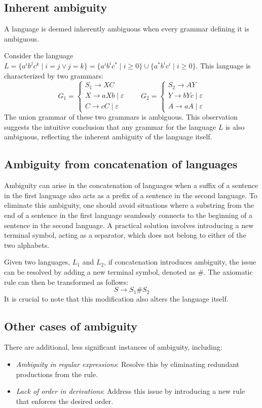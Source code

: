\subsection{Inherent ambiguity}
A language is deemed inherently ambiguous when every grammar defining it is ambiguous.
\begin{example}
    Consider the language $L=\{a^ib^jc^k\mid i=j \lor j=k\}=\{a^ib^ic^{\ast}\mid i \geq 0\} \cup \{a^{\ast}b^ic^i\mid i \geq 0\}$. 
    This language is characterized by two grammars:
    \[G_1=\begin{cases}
        S_1 \rightarrow XC \\
        X \rightarrow aXb\mid\varepsilon \\
        C \rightarrow cC\mid\varepsilon
    \end{cases}    
    \qquad G_2=\begin{cases}
        S_2 \rightarrow AY \\
        Y \rightarrow bYc\mid\varepsilon \\
        A \rightarrow aA\mid\varepsilon
    \end{cases}\]
    The union grammar of these two grammars is ambiguous.
    This observation suggests the intuitive conclusion that any grammar for the language $L$ is also ambiguous, reflecting the inherent ambiguity of the language itself.
\end{example}

\subsection{Ambiguity from concatenation of languages}
Ambiguity can arise in the concatenation of languages when a suffix of a sentence in the first language also acts as a prefix of a sentence in the second language.
To eliminate this ambiguity, one should avoid situations where a substring from the end of a sentence in the first language seamlessly connects to the beginning of a sentence in the second language.
A practical solution involves introducing a new terminal symbol, acting as a separator, which does not belong to either of the two alphabets.
\begin{example}
    Given two languages, $L_1$ and $L_2$, if concatenation introduces ambiguity, the issue can be resolved by adding a new terminal symbol, denoted as $\#$.
    The axiomatic rule can then be transformed as follows:
    \[S \rightarrow S_1 \# S_2\]
    It is crucial to note that this modification also alters the language itself.
\end{example}

\subsection{Other cases of ambiguity}
There are additional, less significant instances of ambiguity, including:
\begin{itemize}
    \item \textit{Ambiguity in regular expressions}: Resolve this by eliminating redundant productions from the rule.
    \item \textit{Lack of order in derivations}: Address this issue by introducing a new rule that enforces the desired order.
\end{itemize}
